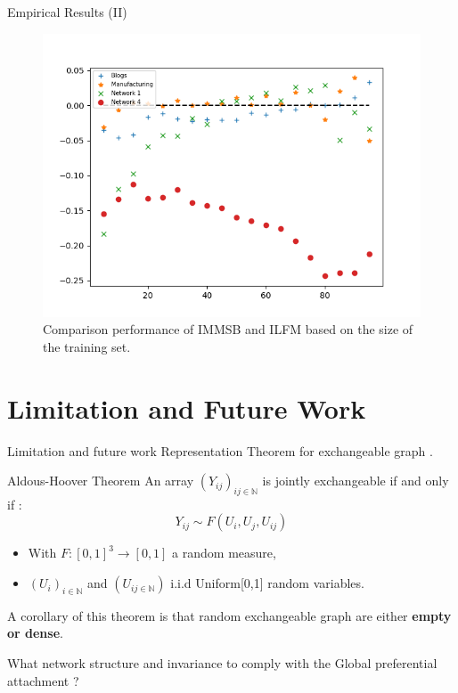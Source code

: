 \begin{frame}[c]{Empirical Results (II)}
        \begin{figure}[h]
            \caption{Comparison performance of IMMSB and ILFM based on the size of the training set.}
        \includegraphics[scale=0.5]{img/testset_max_20_roc_evolution}
        \end{figure}
\end{frame}


\section{Limitation and Future Work}

\begin{frame}[c]{Limitation and future work}
    Representation Theorem for exchangeable graph .

    \begin{block}{Aldous-Hoover Theorem}
        An array $(Y_{ij})_{{ij}\in \mathbb{N}}$ is jointly exchangeable if and only if :
    \begin{equation}
        Y_{ij} \sim F(U_i, U_j, U_{ij})
    \end{equation}

    \begin{itemize}
        \item With $F: [0,1]^3 \rightarrow [0,1]$ a random measure, 
        \item  $(U_i)_{i\in \mathbb{N}}$ and $(U_{{ij}\in \mathbb{N}})$   i.i.d Uniform[0,1] random variables.
    \end{itemize}
    \end{block}

    A corollary of this theorem is that random exchangeable graph are either \textbf{empty or dense}.
    \vspace{1cm}

    \MVRightarrow{} What network structure and invariance to comply with the Global preferential attachment ?

\end{frame}


